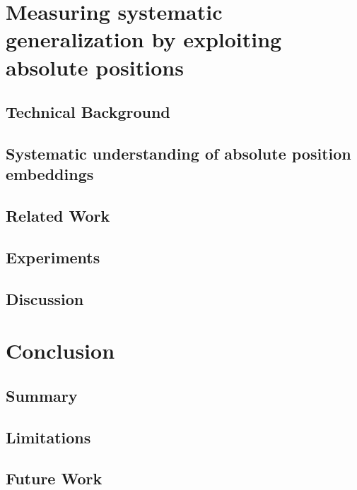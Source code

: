 \documentclass[letterpaper, 12pt]{report}
\begin{document}
\clearpage
\chapter{Measuring systematic generalization by exploiting absolute positions}
\label{sec:orga46bf45}

\section{Technical Background}
\label{sec:orge8b9409}
\section{Systematic understanding of absolute position embeddings}
\label{sec:orgf8ea1d9}
\section{Related Work}
\label{sec:org05c8af6}
\section{Experiments}
\label{sec:orgc6f5de8}


\section{Discussion}
\label{sec:orgbc43cdd}
\clearpage

\chapter{Conclusion}
\label{sec:org8fd280e}
\section{Summary}
\label{sec:org94aab9a}
\section{Limitations}
\label{sec:org217d56a}
\section{Future Work}
\label{sec:org9de237c}
\end{document}
